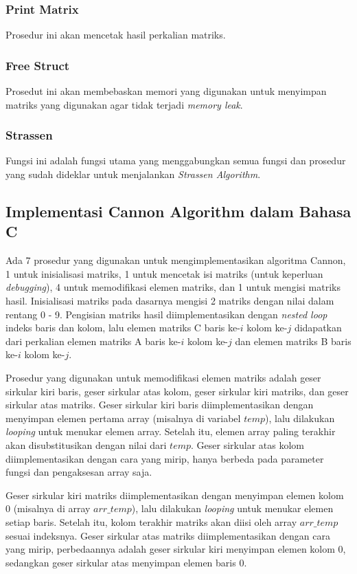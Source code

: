 \documentclass[conference]{IEEEtran}
\begin{document}
\subsubsection{Print Matrix} Prosedur ini akan mencetak hasil perkalian matriks.

\subsubsection{Free Struct} Prosedut ini akan membebaskan memori yang digunakan untuk menyimpan matriks yang digunakan agar tidak terjadi \textit{memory leak}.

\subsubsection{Strassen} Fungsi ini adalah fungsi utama yang menggabungkan semua fungsi dan prosedur yang sudah dideklar untuk menjalankan \textit{Strassen Algorithm}.


\subsection{Implementasi Cannon Algorithm dalam Bahasa C}
Ada 7 prosedur yang digunakan untuk mengimplementasikan algoritma Cannon, 1 untuk inisialisasi matriks, 1 untuk mencetak isi matriks (untuk keperluan \textit{debugging}), 
4 untuk memodifikasi elemen matriks, dan 1 untuk mengisi matriks hasil.
Inisialisasi matriks pada dasarnya mengisi 2 matriks dengan nilai dalam rentang 0 - 9.
Pengisian matriks hasil diimplementasikan dengan \textit{nested loop} indeks baris dan kolom, 
lalu elemen matriks C baris ke-$i$ kolom ke-$j$ didapatkan dari perkalian elemen matriks A baris ke-$i$ kolom ke-$j$ dan elemen matriks B baris ke-$i$ kolom ke-$j$.

Prosedur yang digunakan untuk memodifikasi elemen matriks adalah geser sirkular kiri baris, geser sirkular atas kolom, geser sirkular kiri matriks, dan geser sirkular atas matriks.
Geser sirkular kiri baris diimplementasikan dengan menyimpan elemen pertama array (misalnya di variabel $temp$), lalu dilakukan \textit{looping} untuk menukar elemen array.
Setelah itu, elemen array paling terakhir akan disubstitusikan dengan nilai dari $temp$.
Geser sirkular atas kolom diimplementasikan dengan cara yang mirip, hanya berbeda pada parameter fungsi dan pengaksesan array saja.

Geser sirkular kiri matriks diimplementasikan dengan menyimpan elemen kolom 0 (misalnya di array $arr\_temp$), lalu dilakukan \textit{looping} untuk menukar elemen setiap baris.
Setelah itu, kolom terakhir matriks akan diisi oleh array $arr\_temp$ sesuai indeksnya.
Geser sirkular atas matriks diimplementasikan dengan cara yang mirip, 
perbedaannya adalah geser sirkular kiri menyimpan elemen kolom 0, sedangkan geser sirkular atas menyimpan elemen baris 0.
\end{document}
